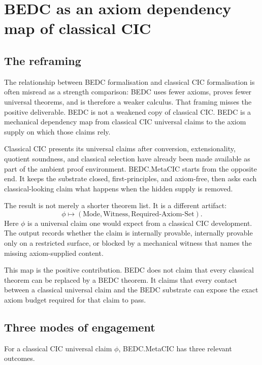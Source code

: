 \chapter{BEDC as an axiom dependency map of classical CIC}
\label{ch:bedc-axiom-dependency-map}

\section{The reframing}
\label{sec:bedc-axiom-dependency-map-reframing}

The relationship between BEDC formalisation and classical CIC formalisation is often misread as a strength comparison: BEDC uses fewer axioms, proves fewer universal theorems, and is therefore a weaker calculus. That framing misses the positive deliverable. BEDC is not a weakened copy of classical CIC. BEDC is a mechanical dependency map from classical CIC universal claims to the axiom supply on which those claims rely.

Classical CIC presents its universal claims after conversion, extensionality, quotient soundness, and classical selection have already been made available as part of the ambient proof environment. BEDC.MetaCIC starts from the opposite end. It keeps the substrate closed, first-principles, and axiom-free, then asks each classical-looking claim what happens when the hidden supply is removed.

The result is not merely a shorter theorem list. It is a different artifact:
$$
\phi \mapsto
(\text{Mode},\text{Witness},\text{Required-Axiom-Set}).
$$
Here $\phi$ is a universal claim one would expect from a classical CIC development. The output records whether the claim is internally provable, internally provable only on a restricted surface, or blocked by a mechanical witness that names the missing axiom-supplied content.

This map is the positive contribution. BEDC does not claim that every classical theorem can be replaced by a BEDC theorem. It claims that every contact between a classical universal claim and the BEDC substrate can expose the exact axiom budget required for that claim to pass.

\section{Three modes of engagement}
\label{sec:bedc-axiom-dependency-map-three-modes}

For a classical CIC universal claim $\phi$, BEDC.MetaCIC has three relevant outcomes.

